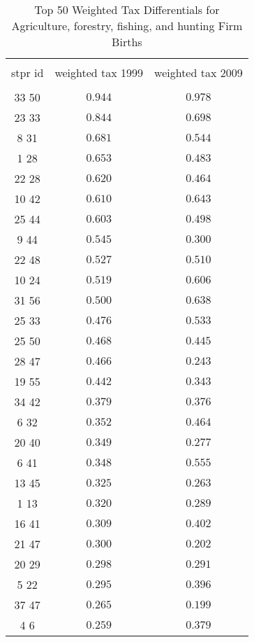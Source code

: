 
\begin{table}[!htbp] \centering 
  \caption{Top 50 Weighted Tax Differentials for  Agriculture, forestry, fishing, and hunting Firm Births} 
  \label{} 
\tiny 
\begin{tabular}{@{\extracolsep{5pt}} ccc} 
\\[-1.8ex]\hline 
\hline \\[-1.8ex] 
stpr id & weighted tax 1999 & weighted tax 2009 \\ 
\hline \\[-1.8ex] 
33 50  & $0.944$ & $0.978$ \\ 
23 33  & $0.844$ & $0.698$ \\ 
8 31  & $0.681$ & $0.544$ \\ 
1 28  & $0.653$ & $0.483$ \\ 
22 28  & $0.620$ & $0.464$ \\ 
10 42  & $0.610$ & $0.643$ \\ 
25 44  & $0.603$ & $0.498$ \\ 
9 44  & $0.545$ & $0.300$ \\ 
22 48  & $0.527$ & $0.510$ \\ 
10 24  & $0.519$ & $0.606$ \\ 
31 56  & $0.500$ & $0.638$ \\ 
25 33  & $0.476$ & $0.533$ \\ 
25 50  & $0.468$ & $0.445$ \\ 
28 47  & $0.466$ & $0.243$ \\ 
19 55  & $0.442$ & $0.343$ \\ 
34 42  & $0.379$ & $0.376$ \\ 
6 32  & $0.352$ & $0.464$ \\ 
20 40  & $0.349$ & $0.277$ \\ 
6 41  & $0.348$ & $0.555$ \\ 
13 45  & $0.325$ & $0.263$ \\ 
1 13  & $0.320$ & $0.289$ \\ 
16 41  & $0.309$ & $0.402$ \\ 
21 47  & $0.300$ & $0.202$ \\ 
20 29  & $0.298$ & $0.291$ \\ 
5 22  & $0.295$ & $0.396$ \\ 
37 47  & $0.265$ & $0.199$ \\ 
4 6  & $0.259$ & $0.379$ \\ 

\end{tabular}
\end{table}
